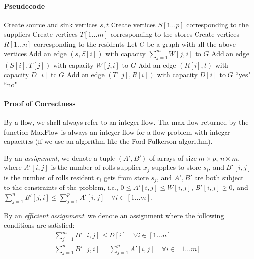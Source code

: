 \documentclass[answers]{exam}
\begin{document}
\begin{questions}
\begin{solution}

\paragraph{Pseudocode}
\begin{algorithmic}[1]
    \State Create source and sink vertices $s, t$
    \State Create vertices $S[1 \ldots p]$ corresponding to the suppliers
    \State Create vertices $T[1 \ldots m]$ corresponding to the stores
    \State Create vertices $R[1 \ldots n]$ corresponding to the residents
    \State Let $G$ be a graph with all the above vertices
        \State Add an edge $(s, S[i])$ with capacity $\sum_{j = 1}^m W[j, i]$ to $G$
            \State Add an edge $(S[i], T[j])$ with capacity $W[j, i]$ to $G$
        \EndFor
    \EndFor
        \State Add an edge $(R[i], t)$ with capacity $D[i]$ to $G$
                \State Add an edge $(T[j], R[i])$ with capacity $D[i]$ to $G$
            \EndIf
        \EndFor
    \EndFor
        \State \Return ``yes"
    \Else
        \State \Return ``no"
    \EndIf
\EndFunction
\end{algorithmic}

\paragraph{Proof of Correctness}

By a flow, we shall always refer to an integer flow. The max-flow returned by the function MaxFlow is always an integer flow for a flow problem with integer capacities (if we use an algorithm like the Ford-Fulkerson algorithm).

By an \textit{assignment}, we denote a tuple $(A', B')$ of arrays of size $m \times p$, $n\times m$, where $A'[i, j]$ is the number of rolls supplier $x_j$ supplies to store $s_i$, and $B'[i, j]$ is the number of rolls resident $r_i$ gets from store $s_j$, and $A', B'$ are both subject to the constraints of the problem, i.e., $0 \le A'[i, j] \le W[i, j]$, $B'[i, j] \ge 0$, and $\sum_{j = 1}^n B'[j, i] \le \sum_{j = 1}^p A'[i, j] \quad \forall i \in [1\ldots m]$.

By an \textit{efficient assignment}, we denote an assignment where the following conditions are satisfied:
\begin{align}
    \sum_{j = 1}^m B'[i, j] \le D[i] \quad \forall i \in [1\ldots n]\\
    \sum_{j = 1}^n B'[j, i] = \sum_{j = 1}^p A'[i, j] \quad \forall i \in [1\ldots m]
\end{align}


\end{solution}
\end{questions}
\end{document}
